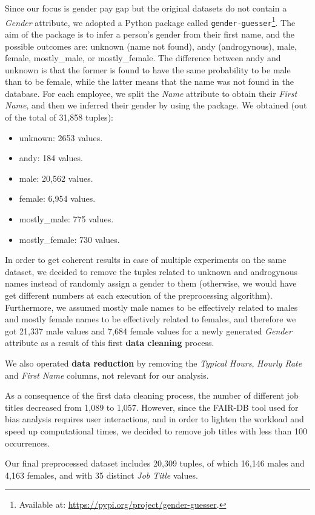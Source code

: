 Since our focus is gender pay gap but the original datasets do not contain a \textit{Gender} attribute, we adopted a Python package called \texttt{gender-guesser}\footnote{Available at: \url{https://pypi.org/project/gender-guesser}.}. The aim of the package is to infer a person's gender from their first name, and the possible outcomes are: unknown (name not found), andy (androgynous), male, female, mostly\_male, or mostly\_female. The difference between andy and unknown is that the former is found to have the same probability to be male than to be female, while the latter means that the name was not found in the database. For each employee, we split the \textit{Name} attribute to obtain their \textit{First Name}, and then we inferred their gender by using the package. We obtained (out of the total of 31,858 tuples):
\begin{itemize}
\item unknown: 2653 values.
\item andy: 184 values.
\item male: 20,562 values.
\item female: 6,954 values.
\item mostly\_male: 775 values.
\item mostly\_female: 730 values.
\end{itemize}
In order to get coherent results in case of multiple experiments on the same dataset, we decided to remove the tuples related to unknown and androgynous names instead of randomly assign a gender to them (otherwise, we would have get different numbers at each execution of the preprocessing algorithm). Furthermore, we assumed mostly male names to be effectively related to males and mostly female names to be effectively related to females, and therefore we got 21,337 male values and 7,684 female values for a newly generated \textit{Gender} attribute as a result of this first \textbf{data cleaning} process.

We also operated \textbf{data reduction} by removing the \textit{Typical Hours}, \textit{Hourly Rate} and \textit{First Name} columns, not relevant for our analysis.

As a consequence of the first data cleaning process, the number of different job titles decreased from 1,089 to 1,057. However, since the FAIR-DB tool used for bias analysis requires user interactions, and in order to lighten the workload and speed up computational times, we decided to remove job titles with less than 100 occurrences.

Our final preprocessed dataset includes 20,309 tuples, of which 16,146 males and 4,163 females, and with 35 distinct \textit{Job Title} values.


